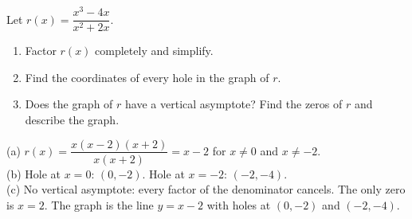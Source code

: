 \begin{exo}{}
Let $r(x)=\dfrac{x^3-4x}{x^2+2x}$.
\begin{enumerate}[label=(\alph*)]
\item Factor $r(x)$ completely and simplify.
\item Find the coordinates of every hole in the graph of $r$.
\item Does the graph of $r$ have a vertical asymptote? Find the zeros of $r$ and describe the graph.
\end{enumerate}
\begin{solution}
(a) $r(x)=\dfrac{x(x-2)(x+2)}{x(x+2)}=x-2$ for $x\neq0$ and $x\neq-2$.\\
(b) Hole at $x=0$: $(0,-2)$. Hole at $x=-2$: $(-2,-4)$.\\
(c) No vertical asymptote: every factor of the denominator cancels. The only zero is $x=2$. The graph is the line $y=x-2$ with holes at $(0,-2)$ and $(-2,-4)$.
\end{solution}
\end{exo}

